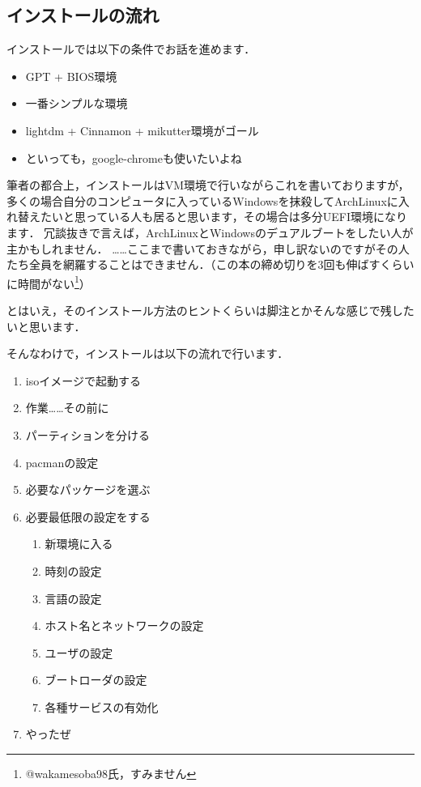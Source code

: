 \documentclass[b5j,twoside,openany]{jsbook}
\begin{document}
    \subsection{インストールの流れ}
      インストールでは以下の条件でお話を進めます．
      \begin{itemize}
        \item GPT + BIOS環境
        \item 一番シンプルな環境
        \item lightdm + Cinnamon + mikutter環境がゴール
        \item といっても，google-chromeも使いたいよね
      \end{itemize}
      筆者の都合上，インストールはVM環境で行いながらこれを書いておりますが，
      多くの場合自分のコンピュータに入っているWindowsを抹殺してArchLinuxに入れ替えたいと思っている人も居ると思います，その場合は多分UEFI環境になります．
      冗談抜きで言えば，ArchLinuxとWindowsのデュアルブートをしたい人が主かもしれません．
      ……ここまで書いておきながら，申し訳ないのですがその人たち全員を網羅することはできません．（この本の締め切りを3回も伸ばすくらいに時間がない\footnote{@wakamesoba98氏，すみません}）

      とはいえ，そのインストール方法のヒントくらいは脚注とかそんな感じで残したいと思います．
      
      そんなわけで，インストールは以下の流れで行います．
      \begin{enumerate}
        \item isoイメージで起動する
        \item 作業……その前に
        \item パーティションを分ける
        \item pacmanの設定
        \item 必要なパッケージを選ぶ
        \item 必要最低限の設定をする
          \begin{enumerate}
            \item 新環境に入る
            \item 時刻の設定
            \item 言語の設定
            \item ホスト名とネットワークの設定
            \item ユーザの設定
            \item ブートローダの設定
            \item 各種サービスの有効化
          \end{enumerate}
        \item やったぜ
      \end{enumerate}
\end{document}
